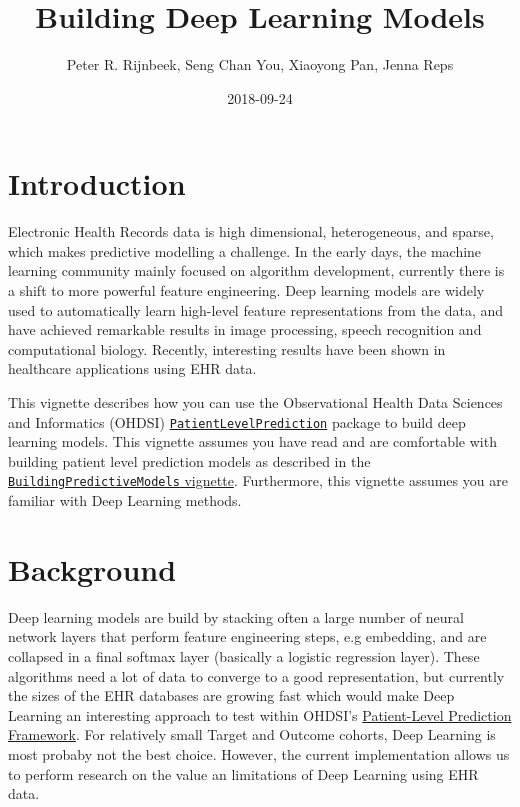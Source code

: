 \documentclass[]{article}
\title{Building Deep Learning Models}
\author{Peter R. Rijnbeek, Seng Chan You, Xiaoyong Pan, Jenna Reps}
\date{2018-09-24}
\begin{document}
\maketitle

{
\setcounter{tocdepth}{2}
\tableofcontents
}
\section{Introduction}\label{introduction}

Electronic Health Records data is high dimensional, heterogeneous, and
sparse, which makes predictive modelling a challenge. In the early days,
the machine learning community mainly focused on algorithm development,
currently there is a shift to more powerful feature engineering. Deep
learning models are widely used to automatically learn high-level
feature representations from the data, and have achieved remarkable
results in image processing, speech recognition and computational
biology. Recently, interesting results have been shown in healthcare
applications using EHR data.

This vignette describes how you can use the Observational Health Data
Sciences and Informatics (OHDSI)
\href{http://github.com/OHDSI/PatientLevelPrediction}{\texttt{PatientLevelPrediction}}
package to build deep learning models. This vignette assumes you have
read and are comfortable with building patient level prediction models
as described in the
\href{https://github.com/OHDSI/PatientLevelPrediction/blob/master/inst/doc/BuildingPredictiveModels.pdf}{\texttt{BuildingPredictiveModels}
vignette}. Furthermore, this vignette assumes you are familiar with Deep
Learning methods.

\section{Background}\label{background}

Deep learning models are build by stacking often a large number of
neural network layers that perform feature engineering steps, e.g
embedding, and are collapsed in a final softmax layer (basically a
logistic regression layer). These algorithms need a lot of data to
converge to a good representation, but currently the sizes of the EHR
databases are growing fast which would make Deep Learning an interesting
approach to test within OHDSI's
\href{https://academic.oup.com/jamia/article/25/8/969/4989437}{Patient-Level
Prediction Framework}. For relatively small Target and Outcome cohorts,
Deep Learning is most probaby not the best choice. However, the current
implementation allows us to perform research on the value an limitations
of Deep Learning using EHR data.
\end{document}
